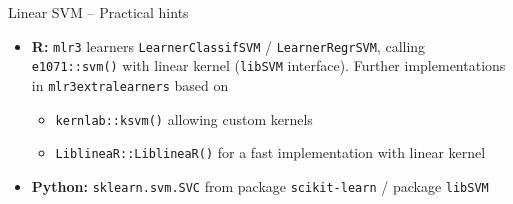 \begin{frame}{Linear SVM -- Practical hints}
\begin{itemize}
  \item \textbf{R:} \texttt{mlr3} learners \texttt{LearnerClassifSVM} /
  \texttt{LearnerRegrSVM}, calling \texttt{e1071::svm()} with linear kernel (\texttt{libSVM} interface).
  Further implementations in \texttt{mlr3extralearners} based on
  \begin{itemize}
      \item \texttt{kernlab::ksvm()} allowing custom kernels
      \item \texttt{LiblineaR::LiblineaR()} for a fast implementation with linear kernel
  \end{itemize}
  \item \textbf{Python:} \texttt{sklearn.svm.SVC} from package 
  \texttt{scikit-learn} / package \texttt{libSVM}
\end{itemize}

\end{frame}








